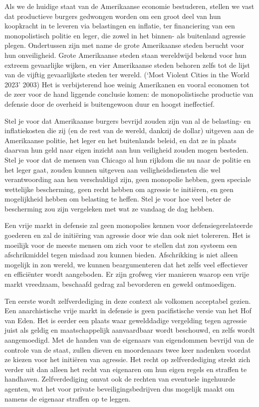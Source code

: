 \documentclass[
  a5paper,
  smalldemyvopaper,11pt,twoside,onecolumn,openright,extrafontsizes,
hidelinks]{memoir}
\begin{document}
Als we de huidige staat van de Amerikaanse economie bestuderen, stellen
we vast dat productieve burgers gedwongen worden om een groot deel van
hun koopkracht in te leveren via belastingen en inflatie, ter
financiering van een monopolistisch politie en leger, die zowel in het
binnen- als buitenland agressie plegen. Ondertussen zijn met name de
grote Amerikaanse steden berucht voor hun onveiligheid. Grote
Amerikaanse steden staan wereldwijd bekend voor hun extreem gevaarlijke
wijken, en vier Amerikaanse steden behoren zelfs tot de lijst van de
vijftig gevaarlijkste steden ter wereld. ({`Most Violent Cities in the
World 2023'} 2003) Het is verbijsterend hoe weinig Amerikanen en vooral
economen tot de zeer voor de hand liggende conclusie komen: de
monopolistische productie van defensie door de overheid is buitengewoon
duur en hoogst ineffectief.

Stel je voor dat Amerikaanse burgers bevrijd zouden zijn van al de
belasting- en inflatiekosten die zij (en de rest van de wereld, dankzij
de dollar) uitgeven aan de Amerikaanse politie, het leger en het
buitenlands beleid, en dat ze in plaats daarvan hun geld naar eigen
inzicht aan hun veiligheid zouden mogen besteden. Stel je voor dat de
mensen van Chicago al hun rijkdom die nu naar de politie en het leger
gaat, zouden kunnen uitgeven aan veiligheidsdiensten die wel
verantwoording aan hen verschuldigd zijn, geen monopolie hebben, geen
speciale wettelijke bescherming, geen recht hebben om agressie te
initiëren, en geen mogelijkheid hebben om belasting te heffen. Stel je
voor hoe veel beter de bescherming zou zijn vergeleken met wat ze
vandaag de dag hebben.

Een vrije markt in defensie zal geen monopolies kennen voor
defensiegerelateerde goederen en zal de initiëring van agressie door wie
dan ook niet tolereren. Het is moeilijk voor de meeste mensen om zich
voor te stellen dat zon systeem een afschrikmiddel tegen misdaad zou
kunnen bieden. Afschrikking is niet alleen mogelijk in zon wereld, we
kunnen beargumenteren dat het zelfs veel effectiever en efficiënter
wordt aangeboden. Er zijn grofweg vier manieren waarop een vrije markt
vreedzaam, beschaafd gedrag zal bevorderen en geweld ontmoedigen.

Ten eerste wordt zelfverdediging in deze context als volkomen acceptabel
gezien. Een anarchistische vrije markt in defensie is geen pacifistische
versie van het Hof van Eden. Het is eerder een plaats waar gewelddadige
vergelding tegen agressie juist als geldig en maatschappelijk
aanvaardbaar wordt beschouwd, en zelfs wordt aangemoedigd. Met de handen
van de eigenaars van eigendommen bevrijd van de controle van de staat,
zullen dieven en moordenaars twee keer nadenken voordat ze kiezen voor
het initiëren van agressie. Het recht op zelfverdediging strekt zich
verder uit dan alleen het recht van eigenaren om hun eigen regels en
straffen te handhaven. Zelfverdediging omvat ook de rechten van
eventuele ingehuurde agenten, wat het voor private beveiligingsbedrijven
dus mogelijk maakt om namens de eigenaar straffen op te leggen.
\end{document}
